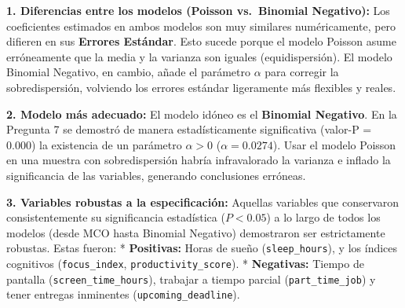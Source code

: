 \documentclass[11pt]{article}
\begin{document}
\textbf{1. Diferencias entre los modelos (Poisson vs.~Binomial
Negativo):} Los coeficientes estimados en ambos modelos son muy
similares numéricamente, pero difieren en sus \textbf{Errores Estándar}.
Esto sucede porque el modelo Poisson asume erróneamente que la media y
la varianza son iguales (equidispersión). El modelo Binomial Negativo,
en cambio, añade el parámetro \(\alpha\) para corregir la
sobredispersión, volviendo los errores estándar ligeramente más
flexibles y reales.

\textbf{2. Modelo más adecuado:} El modelo idóneo es el \textbf{Binomial
Negativo}. En la Pregunta 7 se demostró de manera estadísticamente
significativa (valor-P = 0.000) la existencia de un parámetro
\(\alpha > 0\) (\(\alpha = 0.0274\)). Usar el modelo Poisson en una
muestra con sobredispersión habría infravalorado la varianza e inflado
la significancia de las variables, generando conclusiones erróneas.

\textbf{3. Variables robustas a la especificación:} Aquellas variables
que conservaron consistentemente su significancia estadística
(\(P < 0.05\)) a lo largo de todos los modelos (desde MCO hasta Binomial
Negativo) demostraron ser estrictamente robustas. Estas fueron: *
\textbf{Positivas:} Horas de sueño (\texttt{sleep\_hours}), y los
índices cognitivos (\texttt{focus\_index},
\texttt{productivity\_score}). * \textbf{Negativas:} Tiempo de pantalla
(\texttt{screen\_time\_hours}), trabajar a tiempo parcial
(\texttt{part\_time\_job}) y tener entregas inminentes
(\texttt{upcoming\_deadline}).


    
    
    
\end{document}
